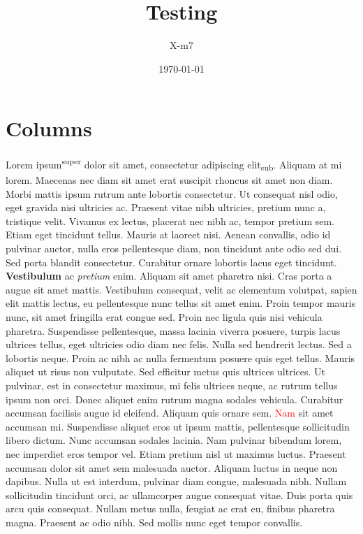 \documentclass{article}
\title{Testing}
\author{X-m7}
\date{\today}
\begin{document}
    \maketitle
    \section{Columns}
    \begin{multicols}{5}
        \scriptsize
		Lorem ipsum\textsuperscript{super} dolor sit amet, consectetur adipiscing elit\textsubscript{sub}. Aliquam at mi lorem. Maecenas nec diam sit amet erat suscipit rhoncus sit amet non diam. Morbi mattis ipsum rutrum ante lobortis consectetur. Ut consequat nisl odio, eget gravida nisi ultricies ac. Praesent vitae nibh ultricies, pretium nunc a, tristique velit. Vivamus ex lectus, placerat nec nibh ac, tempor pretium sem. Etiam eget tincidunt tellus. Mauris at laoreet nisi. Aenean convallis, odio id pulvinar auctor, nulla eros pellentesque diam, non tincidunt ante odio sed dui. Sed porta blandit consectetur. Curabitur ornare lobortis lacus eget tincidunt.
        \textbf{Vestibulum} ac \textit{pretium} enim. Aliquam sit amet pharetra nisi. Cras porta a augue sit amet mattis. Vestibulum consequat, velit ac elementum volutpat, sapien elit mattis lectus, eu pellentesque nunc tellus sit amet enim. Proin tempor mauris nunc, sit amet fringilla erat congue sed. Proin nec ligula quis nisi vehicula pharetra. Suspendisse pellentesque, massa lacinia viverra posuere, turpis lacus ultrices tellus, eget ultricies odio diam nec felis. Nulla sed hendrerit lectus. Sed a lobortis neque. Proin ac nibh ac nulla fermentum posuere quis eget tellus. Mauris aliquet ut risus non vulputate. Sed efficitur metus quis ultrices ultrices. Ut pulvinar, est in consectetur maximus, mi felis ultrices neque, ac rutrum tellus ipsum non orci. Donec aliquet enim rutrum magna sodales vehicula. Curabitur accumsan facilisis augue id eleifend. Aliquam quis ornare sem.
        \textcolor{red}{Nam} sit amet accumsan mi. Suspendisse aliquet eros ut ipsum mattis, pellentesque sollicitudin libero dictum. Nunc accumsan sodales lacinia. Nam pulvinar bibendum lorem, nec imperdiet eros tempor vel. Etiam pretium nisl ut maximus luctus. Praesent accumsan dolor sit amet sem malesuada auctor. Aliquam luctus in neque non dapibus. Nulla ut est interdum, pulvinar diam congue, malesuada nibh. Nullam sollicitudin tincidunt orci, ac ullamcorper augue consequat vitae. Duis porta quis arcu quis consequat. Nullam metus nulla, feugiat ac erat eu, finibus pharetra magna. Praesent ac odio nibh. Sed mollis nunc eget tempor convallis.

\end{multicols}
\end{document}
